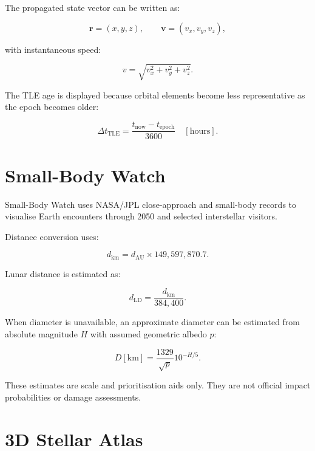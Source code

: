 \documentclass[11pt,a4paper]{article}
\begin{document}
The propagated state vector can be written as:

\begin{equation}
\mathbf{r}=(x,y,z), \qquad \mathbf{v}=(v_x,v_y,v_z),
\end{equation}

with instantaneous speed:

\begin{equation}
v=\sqrt{v_x^2+v_y^2+v_z^2}.
\end{equation}

The TLE age is displayed because orbital elements become less representative as the epoch becomes older:

\begin{equation}
\Delta t_{\mathrm{TLE}}=\frac{t_{\mathrm{now}}-t_{\mathrm{epoch}}}{3600}\quad [\mathrm{hours}].
\end{equation}

\section{Small-Body Watch}

Small-Body Watch uses NASA/JPL close-approach and small-body records to visualise Earth encounters through 2050 and selected interstellar visitors.

Distance conversion uses:

\begin{equation}
d_{\mathrm{km}}=d_{\mathrm{AU}}\times149{,}597{,}870.7.
\end{equation}

Lunar distance is estimated as:

\begin{equation}
d_{\mathrm{LD}}=\frac{d_{\mathrm{km}}}{384{,}400}.
\end{equation}

When diameter is unavailable, an approximate diameter can be estimated from absolute magnitude $H$ with assumed geometric albedo $p$:

\begin{equation}
D[\mathrm{km}]=\frac{1329}{\sqrt{p}}10^{-H/5}.
\end{equation}

These estimates are scale and prioritisation aids only. They are not official impact probabilities or damage assessments.

\section{3D Stellar Atlas}
\end{document}
